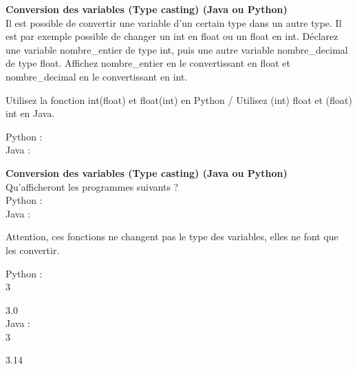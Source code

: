 \begin{Exercice}[20 minutes] \textbf{Conversion des variables (Type casting) (Java ou Python)}\\
   Il est possible de convertir une variable d'un certain type dans un autre type. Il est par exemple possible de changer un int en float ou un float en int. Déclarez une variable nombre\_entier de type int, puis une autre variable nombre\_decimal de type float. Affichez nombre\_entier en le convertissant en float et nombre\_decimal en le convertissant en int. \\
   
    \begin{conseil}
       Utilisez la fonction int(float) et float(int) en Python / Utilisez (int) float et (float) int en Java.
        
    \end{conseil}
    \begin{solution}
    
    Python : \\
    
    
    
    Java : \\
    
    
           
    \end{solution}   
\end{Exercice}

\begin{Exercice}[20 minutes] \textbf{Conversion des variables (Type casting) (Java ou Python)}\\
   Qu'afficheront les programmes suivants ? \\
   
   Python : \\
   
   
   
   Java : \\
   
   
    
   
    \begin{conseil}
      	Attention, ces fonctions ne changent pas le type des variables, elles ne font que les convertir.
        
    \end{conseil}
    \begin{solution}
     
    Python : \\
    
    3
    
    3.0 \\
    
    Java : \\
    
    3
    
    3.14 \\
           
    \end{solution}   
\end{Exercice}

